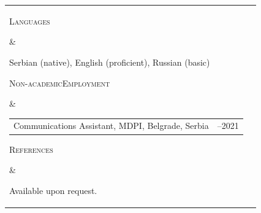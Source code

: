 \documentclass[10pt, a4paper]{article}
\makeatletter
\newlength{\cvlabelwidth}
\newlength{\cvcontentwidth}
\newlength{\cvdatewidth}
\newlength{\cvdatelinegap}
\newlength{\cvtextbandwidth}
\newlength{\cvsectionabove}
\newenvironment{cvbody}{%
  \setlength{\extrarowheight}{2pt}%
  \begin{longtable}{%
    @{}
    >{\small\raggedright}p{\cvlabelwidth}
    @{\hspace{6pt}}
    >{\small}p{\cvcontentwidth}
    @{}
  }
}{%
  \end{longtable}%
}
\newcommand{\cvsection}[2]{%
  \noalign{\vspace{\cvsectionabove}}%
  \parbox[t]{\cvlabelwidth}{\raggedright\strut\textsc{#1}} &
  \parbox[t]{\cvcontentwidth}{#2}\tabularnewline
}
\newcommand{\cvdatedline}[2]{%
  \begin{tabular}[t]{@{}%
    >{\raggedright\arraybackslash}p{\cvtextbandwidth}%
    @{\hspace{\cvdatelinegap}}%
    >{\raggedleft\arraybackslash}p{\cvdatewidth}@{}}%
    #1 & #2\tabularnewline
  \end{tabular}%
}
\makeatother
\begin{document}
\begin{cvbody}
\cvsection{Languages}{%
  Serbian (native), English (proficient), Russian (basic)%
}

\cvsection{Non-academic\newline Employment}{%
  \cvdatedline{Communications Assistant, MDPI, Belgrade, Serbia}{2020--2021}%
}

\cvsection{References}{%
  Available upon request.%
}

\end{cvbody}
\end{document}
